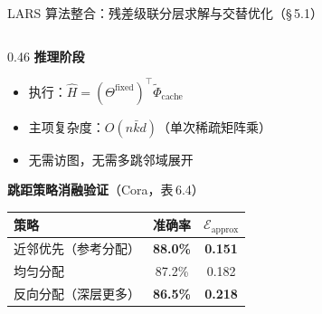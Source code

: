 \documentclass[aspectratio=169,9pt,xcolor=dvipsnames]{beamer}
\newcommand{\highlight}[1]{\textcolor{myred}{\textbf{#1}}}
\newcommand{\green}[1]{\textcolor{mygreen}{#1}}
\newcommand{\kbar}{\ensuremath{\bar{k}}}
\begin{document}
\begin{frame}{LARS 算法整合：残差级联分层求解与交替优化（§\,5.1）}
\begin{columns}[T]
\begin{column}{0.46\textwidth}
  \smallskip
  \textbf{推理阶段}
  \begin{itemize}\small\setlength{\itemsep}{2pt}
    \item 执行：$\hat{H}=(\Theta^{\mathrm{fixed}})^{\top}\tilde{\Phi}_{\mathrm{cache}}$
    \item 主项复杂度：\highlight{$O(n\kbar d)$}（单次稀疏矩阵乘）
    \item 无需访图，无需多跳邻域展开
  \end{itemize}

  \smallskip
  \textbf{跳距策略消融验证}（Cora，表\,6.4）

  {\small\begin{tabular}{lcc}
    \toprule
    策略 & 准确率 & $\mathcal{E}_{\mathrm{approx}}$\\
    \midrule
    近邻优先（参考分配） & \green{\textbf{88.0\%}} & \green{\textbf{0.151}}\\
    均匀分配 & 87.2\% & 0.182\\
    反向分配（深层更多） & \highlight{86.5\%} & \highlight{0.218}\\
    \bottomrule
  \end{tabular}}
\end{column}
\end{columns}
\end{frame}
\end{document}

